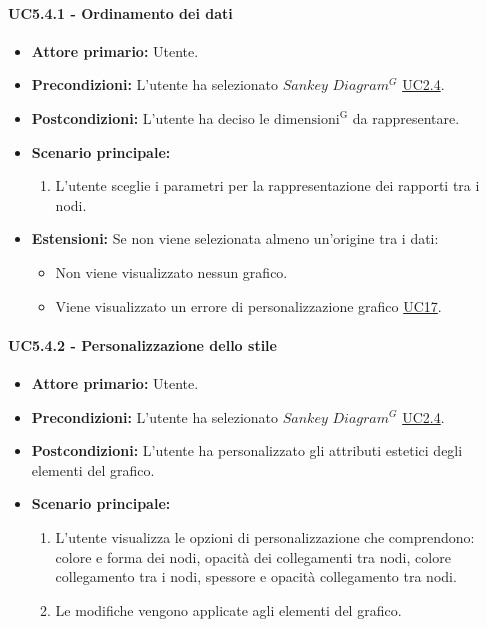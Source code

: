 \paragraph{UC5.4.1 - Ordinamento dei dati}
\label{sec:UC5.4.1}
    \begin{itemize}
        \item \textbf{Attore primario:} Utente.
        \item \textbf{Precondizioni:} L'utente ha selezionato $Sankey$ $Diagram^{G}$ \hyperref[sec:UC2.4]{UC2.4}.
	    \item \textbf{Postcondizioni:} L'utente ha deciso le ${\mathrm{dimensioni^{G}}}$ da rappresentare.
	    \item \textbf{Scenario principale:}
	    \begin{enumerate}
	    		\item L'utente sceglie i parametri per la rappresentazione dei rapporti tra i nodi.
		\end{enumerate}
	    \item \textbf{Estensioni:} Se non viene selezionata almeno un'origine tra i dati:
              \begin{itemize}
                  \item Non viene visualizzato nessun grafico.
                  \item Viene visualizzato un errore di personalizzazione grafico \hyperref[sec:UC17 - Errore di personalizzazione]{UC17}.
              \end{itemize}
    \end{itemize}
\paragraph{UC5.4.2 - Personalizzazione dello stile}
\label{sec:UC5.4.2}
\begin{itemize}
    \item \textbf{Attore primario:} Utente.
    \item \textbf{Precondizioni:} L'utente ha selezionato $Sankey$ $Diagram^{G}$ \hyperref[sec:UC2.4]{UC2.4}.
	\item \textbf{Postcondizioni:} L'utente ha personalizzato gli attributi estetici degli elementi del grafico.
	\item \textbf{Scenario principale:}
	\begin{enumerate}
		\item L'utente visualizza le opzioni di personalizzazione che comprendono:
        colore e forma dei nodi, opacità dei collegamenti tra nodi, colore collegamento tra i nodi, spessore e opacità collegamento tra nodi.
		\item Le modifiche vengono applicate agli elementi del grafico.
	\end{enumerate}
\end{itemize}

